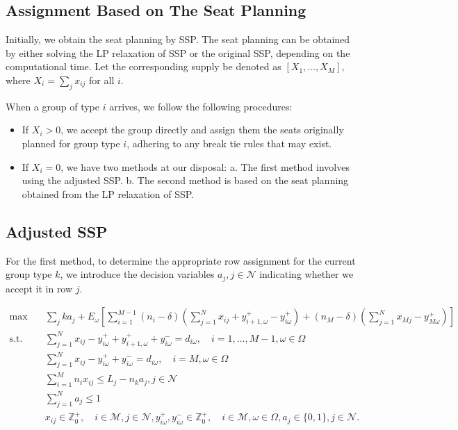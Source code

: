 
\subsection{Assignment Based on The Seat Planning}
Initially, we obtain the seat planning by SSP. The seat planning can be obtained by either solving the LP relaxation of SSP or the original SSP, depending on the computational time. Let the corresponding supply be denoted as $[X_1, \ldots, X_M]$, where $X_i = \sum_{j} x_{ij}$ for all $i$.

When a group of type $i$ arrives, we follow the following procedures:

\begin{itemize}
  \item If $X_i > 0$, we accept the group directly and assign them the seats originally planned for group type $i$, adhering to any break tie rules that may exist.
  \item If $X_i = 0$, we have two methods at our disposal:
  a. The first method involves using the adjusted SSP.
  b. The second method is based on the seat planning obtained from the LP relaxation of SSP.
\end{itemize}


\subsection{Adjusted SSP}
For the first method, to determine the appropriate row assignment for the current group type $k$, we introduce the decision variables $a_j, j \in \mathcal{N}$ indicating whether we accept it in row $j$.

\begin{equation}\label{adjusted_SSP}
  \begin{aligned}
  \max \quad & \sum_{j} k a_j + E_{\omega}\left[\sum_{i=1}^{M-1} (n_i-\delta) (\sum_{j= 1}^{N} x_{ij} + y_{i+1,\omega}^{+} - y_{i \omega}^{+}) + (n_{M}-\delta) (\sum_{j= 1}^{N} x_{Mj} - y_{M \omega}^{+})\right] \\
  \text {s.t.} \quad & \sum_{j= 1}^{N} x_{ij}-y_{i \omega}^{+}+
  y_{i+1, \omega}^{+} + y_{i \omega}^{-}=d_{i \omega}, \quad i = 1,\ldots,M-1, \omega \in \Omega \\
  & \sum_{j= 1}^{N} x_{ij} -y_{i \omega}^{+}+y_{i \omega}^{-}=d_{i \omega}, \quad i = M, \omega \in \Omega \\
  & \sum_{i=1}^{M} n_{i} x_{ij} \leq L_j - n_k a_j, j \in \mathcal{N} \\
  & \sum_{j=1}^{N} a_j \leq 1 \\
  & x_{ij} \in \mathbb{Z}_{0}^{+}, \quad i \in \mathcal{M}, j \in \mathcal{N}, y_{i \omega}^{+}, y_{i \omega}^{-} \in \mathbb{Z}_{0}^{+}, \quad i \in \mathcal{M}, \omega \in \Omega,  a_j \in \{0,1\}, j \in \mathcal{N}.
  \end{aligned}
\end{equation}

